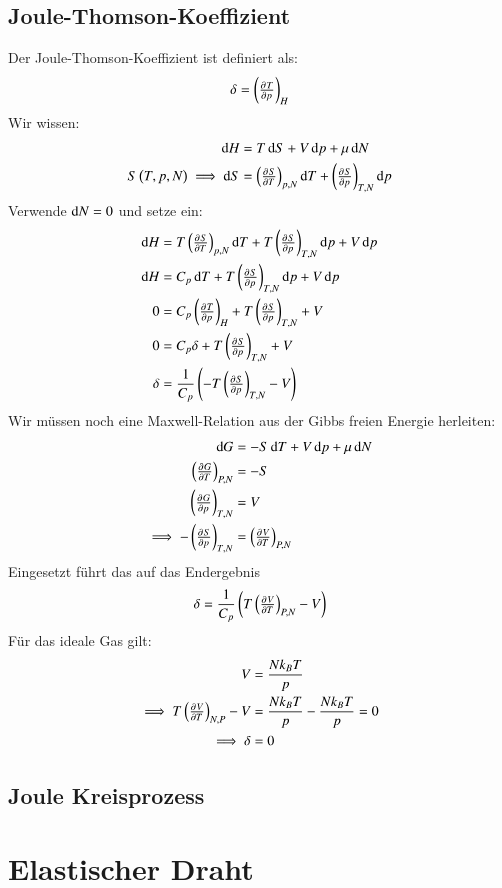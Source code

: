 \subsection{Joule-Thomson-Koeffizient}
Der Joule-Thomson-Koeffizient ist definiert als: 
\[\delta=\del {\pd{T}{p}}_H \]
Wir wissen:
\begin{align*}
\dif H &= T \dif S + V \dif p + \mu \dif N \\
S\del{T,p,N} \implies \dif S &= \del {\pd ST}_{p,N} \dif T + \del{\pd Sp}_{T,N} \dif p
\end{align*}
Verwende $\dif N = 0$ und setze ein:
\begin{align*}
\dif H &= T \del {\pd ST}_{p,N} \dif T + T \del{\pd Sp}_{T,N} \dif p + V \dif p \\
\dif H &= C_p \dif T + T \del{\pd Sp}_{T,N} \dif p + V \dif p \\
0 &= C_p \del {\pd{T}{p}}_H + T \del{\pd Sp}_{T,N}+ V \\
0 &= C_p \delta + T \del{\pd Sp}_{T,N}+ V \\
\delta &= \frac{1}{C_p} \del { -T \del{\pd Sp}_{T,N}- V}
\end{align*}
Wir müssen noch eine Maxwell-Relation aus der Gibbs freien Energie herleiten:
\begin{align*}
\dif G &= -S \dif T + V \dif p + \mu \dif N \\
\del {\pd GT}_{P,N} &= -S \\
\del {\pd Gp}_{T,N} &= V \\
\implies -\del{\pd Sp}_{T,N} &= \del{\pd VT}_{P,N}
\end{align*}
Eingesetzt führt das auf das Endergebnis
\[\delta = \frac{1}{C_p} \del { T \del{\pd VT}_{P,N}- V}\]
Für das ideale Gas gilt:
\begin{align*}
V &= \frac{Nk_B T}{p} \\
\implies T\del{\pd VT}_{N,P}-V &= \frac{Nk_B T}{p} -\frac{Nk_B T}{p} = 0 \\
\implies \delta &= 0
\end{align*}


\subsection{Joule Kreisprozess}


\section{Elastischer Draht}
